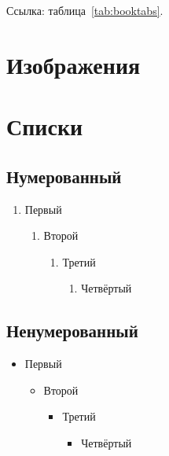 \documentclass[font=modern]{cmcmsuthesis-bachelor}
\begin{document}
Ссылка: таблица~\ref{tab:booktabs}.

\section{Изображения}

\section{Списки}
\subsection{Нумерованный}
\begin{enumerate}\item Первый\begin{enumerate}\item Второй\begin{enumerate}\item Третий\begin{enumerate}\item Четвёртый\end{enumerate}\end{enumerate}\end{enumerate}\end{enumerate}
\subsection{Ненумерованный}
\begin{itemize}\item Первый\begin{itemize}\item Второй\begin{itemize}\item Третий\begin{itemize}\item Четвёртый\end{itemize}\end{itemize}\end{itemize}\end{itemize}
\end{document}
